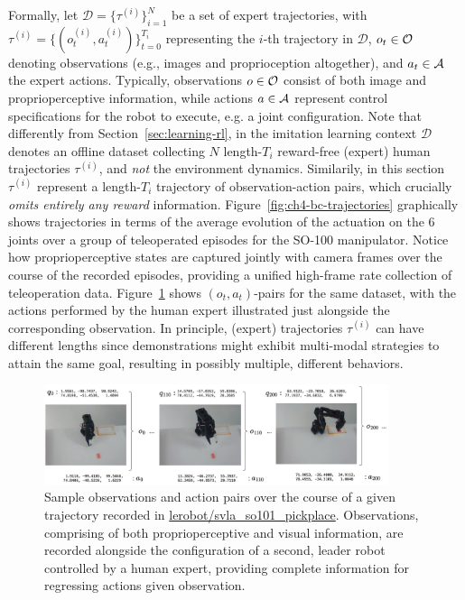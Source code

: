 Formally, let \( \mathcal D = \{ \tau^{(i)} \}_{i=1}^N \) be a set of expert trajectories, with \( \tau^{(i)} = \{(o_t^{(i)}, a_t^{(i)})\}_{t=0}^{T_i} \) representing the \(i\)-th trajectory in \( \mathcal D \), \(o_t \in \mathcal O \) denoting observations (e.g., images and proprioception altogether), and \(a_t \in \mathcal A \) the expert actions.
Typically, observations \( o \in \mathcal O \) consist of both image and proprioperceptive information, while actions \( a \in \mathcal A \) represent control specifications for the robot to execute, e.g. a joint configuration.
Note that differently from Section~\ref{sec:learning-rl}, in the imitation learning context \( \mathcal D \) denotes an offline dataset collecting \( N \) length-\( T_i \) reward-free (expert) human trajectories \( \tau^{(i)} \), and \emph{not} the environment dynamics.
Similarily, in this section \( \tau^{(i)} \) represent a length-\(T_i\) trajectory of observation-action pairs, which crucially \emph{omits entirely any reward} information.
Figure~\ref{fig:ch4-bc-trajectories} graphically shows trajectories in terms of the average evolution of the actuation on the 6 joints over a group of teleoperated episodes for the SO-100 manipulator.
Notice how proprioperceptive states are captured jointly with camera frames over the course of the recorded episodes, providing a unified high-frame rate collection of teleoperation data.
Figure~\ref{fig:ch4-observation-action-mapping} shows \( (o_t, a_t) \)-pairs for the same dataset, with the actions performed by the human expert illustrated just alongside the corresponding observation.
In principle, (expert) trajectories \( \tau^{(i)} \) can have different lengths since demonstrations might exhibit multi-modal strategies to attain the same goal, resulting in possibly multiple, different behaviors.

\begin{figure}
    \centering
    \includegraphics[width=0.9\textwidth]{figures/ch4/ch4-observation-action-mapping.png}
    \caption{Sample observations and action pairs over the course of a given trajectory recorded in \url{lerobot/svla_so101_pickplace}. Observations, comprising of both proprioperceptive and visual information, are recorded alongside the configuration of a second, leader robot controlled by a human expert, providing complete information for regressing actions given observation.}
    \label{fig:ch4-observation-action-mapping}
\end{figure}

